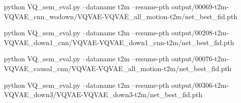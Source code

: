 python VQ_sem_eval.py --dataname t2m --resume-pth output/00069-t2m-VQVAE_cnn_wodown/VQVAE-VQVAE_all_motion-t2m/net_best_fid.pth

python VQ_sem_eval.py --dataname t2m --resume-pth output/00208-t2m-VQVAE_down1_cnn/VQVAE-VQVAE_down1_cnn-t2m/net_best_fid.pth

python VQ_sem_eval.py --dataname t2m --resume-pth output/00076-t2m-VQVAE_causal_cnn/VQVAE-VQVAE_all_motion-t2m/net_best_fid.pth

python VQ_sem_eval.py --dataname t2m --resume-pth output/00306-t2m-VQVAE_down3/VQVAE-VQVAE_down3-t2m/net_best_fid.pth


